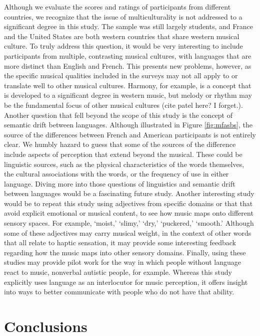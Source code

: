 \documentclass[
  english,
  man,floatsintext]{apa6}
\begin{document}
Although we evaluate the scores and ratings of participants from different countries, we recognize that the issue of multiculturality is not addressed to a significant degree in this study. The sample was still largely students, and France and the United States are both western countries that share western musical culture. To truly address this question, it would be very interesting to include participants from multiple, contrasting musical cultures, with languages that are more distinct than English and French. This presents new problems, however, as the specific musical qualities included in the surveys may not all apply to or translate well to other musical cultures. Harmony, for example, is a concept that is developed to a significant degree in western music, but melody or rhythm may be the fundamental focus of other musical cultures (cite patel here? I forget.).
Another question that fell beyond the scope of this study is the concept of semantic drift between languages. Although illustrated in Figure \ref{fig:mfasbs}, the source of the differences between French and American participants is not entirely clear. We humbly hazard to guess that some of the sources of the difference include aspects of perception that extend beyond the musical. These could be linguistic sources, such as the physical characteristics of the words themselves, the cultural associations with the words, or the frequency of use in either language. Diving more into those questions of linguistics and semantic drift between languages would be a fascinating future study.
Another interesting study would be to repeat this study using adjectives from specific domains or that that avoid explicit emotional or musical content, to see how music maps onto different sensory spaces. For example, `moist,' `slimy,' `dry,' `puckered,' `smooth.' Although some of these adjectives may carry musical weight, in the context of other words that all relate to haptic sensation, it may provide some interesting feedback regarding how the music maps into other sensory domains.
Finally, using these studies may provide pilot work for the way in which people without language react to music, nonverbal autistic people, for example. Whereas this study explicitly uses language as an interlocutor for music perception, it offers insight into ways to better communicate with people who do not have that ability.

\hypertarget{conclusions}{%
\section{Conclusions}\label{conclusions}}
\end{document}
